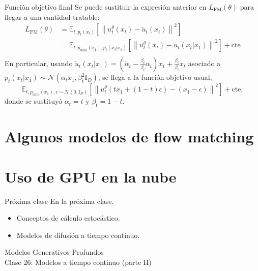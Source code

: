 \documentclass{beamer}
\begin{document}
\begin{frame}{Función objetivo final}
    Se puede sustituir la expresión anterior en $L_\text{FM}(\theta)$ para llegar a una cantidad tratable:
    \begin{align*}
        L_\text{FM}(\theta)
         & =\mathbb{E}_{t,p_t(x_t)}\left[\left\|u_t^\theta(x_t)-\tilde u_t(x_t)\right\|^2\right]                                       \\
         & =\mathbb{E}_{t,p_\text{data}(x_1),p_t(x_t|x_1)}\left[\left\|u_t^\theta(x_t)-\tilde u_t(x_t|x_1)\right\|^2\right]+\text{cte} \\
    \end{align*}
    En particular, usando $\tilde u_t(x_t|x_1)= \left(\dot\alpha_t-\frac{\dot \beta_t}{\beta_t}\alpha_t\right)x_1+\frac{\dot\beta_t}{\beta_t}x_t$ asociado a $p_t(x_t|x_1)\sim\mathcal{N}(\alpha_t x_1,\beta_t^2\text{I}_D)$, se llega a la función objetivo usual,
    \begin{equation*}
        \mathbb{E}_{t,p_\text{data}(x_1),\epsilon\sim\mathcal{N}(0,\text{I}_D)}\left[\left\|u_t^\theta\left(tx_1+(1-t)\epsilon\right)-(x_1-\epsilon)\right\|^2\right]+\text{cte},
    \end{equation*}
    donde se sustituyó $\alpha_t=t$ y $\beta_t=1-t$.
\end{frame}

\section{Algunos modelos de flow matching}

\section{Uso de GPU en la nube}

\begin{frame}{Próxima clase}
    En la próxima clase.
    \begin{itemize}
        \item Conceptos de cálculo estocástico.
        \item Modelos de difusión a tiempo continuo.
    \end{itemize}
\end{frame}

\begin{frame}
    \centering
    \Large{Modelos Generativos Profundos}\\
    \large{Clase 26: Modelos a tiempo continuo (parte II)}
\end{frame}
\end{document}
